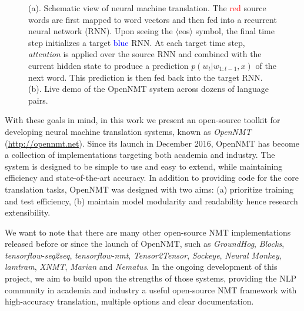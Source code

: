 \documentclass[]{article}
\begin{document}
\begin{figure}[t]
  \centering
  \caption{\small (a). Schematic view of neural machine translation. The \textcolor{red}{red} source words are first mapped to word vectors and then fed into a recurrent neural network (RNN). Upon seeing the $\langle$eos$\rangle$ symbol, the final time step initializes a target \textcolor{blue}{blue} RNN. At each target time step, \textit{attention} is applied over the source RNN and combined with the current hidden state to produce a prediction $p(w_t| w_{1: t-1}, x)$ of the next word. This prediction is then fed back into the target RNN. (b). Live demo of the OpenNMT system across dozens of language pairs.}
  \label{fig:ab}
\end{figure}

With these goals in mind, in this work we present an open-source toolkit for developing
neural machine translation systems, known as \textit{OpenNMT} (\url{http://opennmt.net}). Since its launch in December 2016, OpenNMT has become a collection of implementations targeting both academia and industry. The system is designed to be simple to use and easy to extend, while maintaining efficiency and state-of-the-art accuracy. In
addition to providing code for the core translation tasks, OpenNMT was
designed with two aims: (a) prioritize training and test
efficiency, (b) maintain model modularity and readability hence research extensibility.

We want to note that there are many other open-source NMT implementations released before or since the launch of OpenNMT, such as \textit{GroundHog},
\textit{Blocks}, \textit{tensorflow-seq2seq}, \textit{tensorflow-nmt}, \textit{Tensor2Tensor}, \textit{Sockeye}, \textit{Neural Monkey}, \textit{lamtram}, \textit{XNMT}, \textit{Marian} and \textit{Nematus}. In the ongoing development of this project, we aim to build upon
the strengths of those systems, providing the NLP community in academia and industry a useful open-source NMT framework with high-accuracy translation, multiple options and clear documentation.
\end{document}
